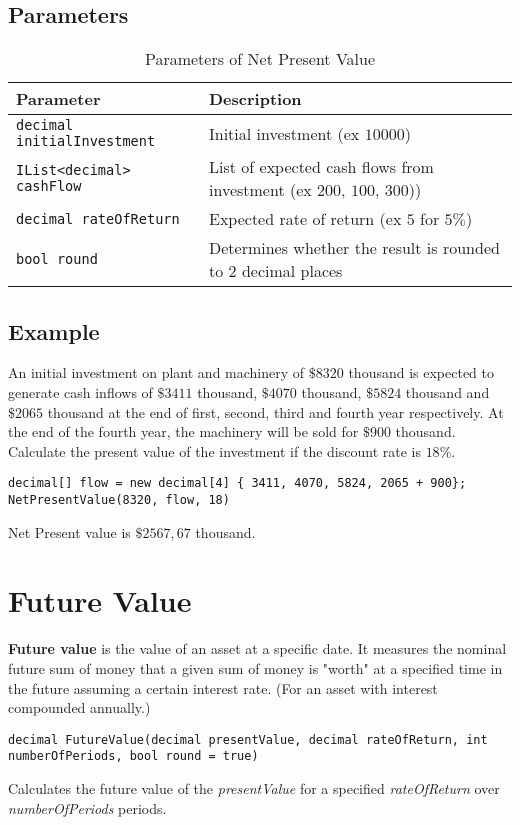 \subsection{Parameters}
\begin{table}[h]
\begin{tabular}{|l|l|}
\hline
\textbf{Parameter} & \textbf{Description}\\
\hline
\verb|decimal initialInvestment| & Initial investment (ex $10000$)\\
\verb|IList<decimal> cashFlow| & List of expected cash flows from investment (ex $200$, $100$, $300$))\\
\verb|decimal rateOfReturn| & Expected rate of return (ex $5$ for $5\%$)\\
\verb|bool round| & Determines whether the result is rounded to $2$ decimal places\\
\hline
\end{tabular}
\caption{Parameters of Net Present Value}
\end{table}

\subsection{Example}
An initial investment on plant and machinery of $\$8320$ thousand is expected to generate cash inflows of $\$3411$ thousand, $\$4070$ thousand, $\$5824$ thousand and $\$2065$ thousand at the end of first, second, third and fourth year respectively. At the end of the fourth year, the machinery will be sold for $\$900$ thousand. Calculate the present value of the investment if the discount rate is $18\%$.

\begin{lstlisting}
decimal[] flow = new decimal[4] { 3411, 4070, 5824, 2065 + 900};
NetPresentValue(8320, flow, 18)
\end{lstlisting}
Net Present value is $\$2567,67$ thousand.





\section{Future Value}
\textbf{Future value} is the value of an asset at a specific date. It measures the nominal future sum of money that a given sum of money is "worth" at a specified time in the future assuming a certain interest rate. (For an asset with interest compounded annually.)
\begin{lstlisting}
decimal FutureValue(decimal presentValue, decimal rateOfReturn, int numberOfPeriods, bool round = true)
\end{lstlisting}
Calculates the future value of the \textit{presentValue} for a specified \textit{rateOfReturn} over \textit{numberOfPeriods} periods.

